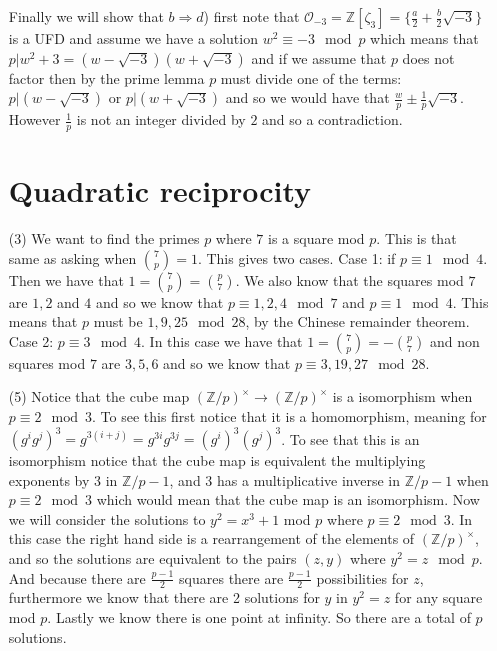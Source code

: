 \documentclass[12pt]{amsart}
\theoremstyle{definition}
\newcommand{\Z}{\mathbb{Z}}
\newcommand{\ra}{\rightarrow}
\begin{document}
\begin{itemize}
 
 Finally we will show that $b\Rightarrow d$) first note that $\mathcal{O}_{-3}=\Z[\zeta_3]=\{\frac{a}{2}+\frac{b}{2}\sqrt{-3}\}$ is a UFD and assume we have a solution $w^2\equiv -3 \mod p$ which means that $p|w^2+3=(w-\sqrt{-3})(w+\sqrt{-3})$ and if we assume that $p$ does not factor then by the prime lemma $p$ must divide one of the terms: $p|(w-\sqrt{-3})$ or $p|(w+\sqrt{-3})$ and so we would have that $\frac{w}{p}\pm\frac{1}{p}\sqrt{-3}$. However $\frac{1}{p}$ is not an integer divided by $2$ and so a contradiction.\\

\section*{Quadratic reciprocity}
\item[(3)] We want to find the primes $p$ where $7$ is a square mod $p$. This is that same as asking when ${7 \choose p}=1$. This gives two cases. Case 1: if $p\equiv 1\mod 4$. Then we have that $1={7 \choose p}= {p \choose 7}$. We also know that the squares mod $7$ are $1,2$ and $4$ and so we know that $p\equiv 1,2,4\mod 7$ and $p\equiv 1 \mod 4$. This means that $p$ must be $1,9,25 \mod 28$, by the Chinese remainder theorem. Case 2: $p\equiv 3 \mod 4$. In this case we have that $1={7 \choose p}= -{p \choose 7}$ and non squares mod $7$ are $3,5,6$ and so we know that $p\equiv 3,19,27\mod 28$.\\

\item[(5)]
Notice that the cube map $(\Z/p)^\times\ra (\Z/p)^\times$ is a isomorphism when $p\equiv 2 \mod 3$. To see this first notice that it is a homomorphism, meaning for $(g^ig^j)^3=g^{3(i+j)}=g^{3i}g^{3j}=(g^i)^3(g^j)^3$. To see that this is an isomorphism notice that the cube map is equivalent the multiplying exponents by $3$ in $\Z/p-1$, and $3$ has a multiplicative inverse in $\Z/p-1$ when $p\equiv 2 \mod 3$ which would mean that the cube map is an isomorphism. Now we will consider the solutions to $y^2=x^3+1$ mod $p$ where $p\equiv 2 \mod 3$. In this case the right hand side is a rearrangement of the elements of $(\Z/p)^\times$, and so the solutions are equivalent to the pairs $(z,y)$ where $y^2=z\mod p$. And because there are $\frac{p-1}{2}$ squares there are $\frac{p-1}{2}$ possibilities for $z$, furthermore we know that there are 2 solutions for $y$ in $y^2=z$ for any square mod $p$. Lastly we know there is one point at infinity. So there are a total of $p$ solutions.

\end{itemize}
\end{document}
